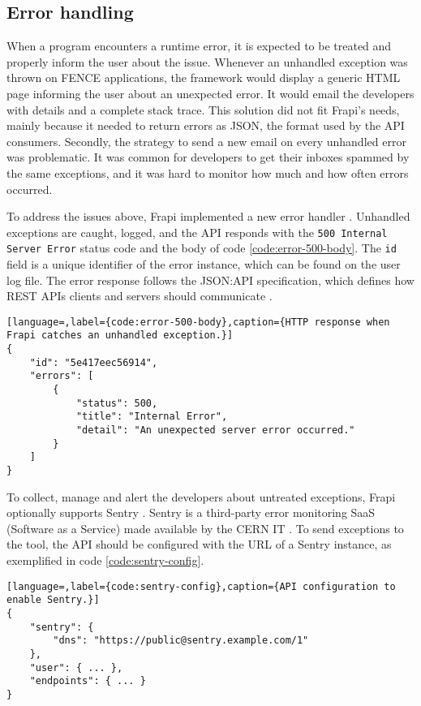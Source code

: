 \subsection{Error handling}

When a program encounters a runtime error, it is expected to be treated and properly inform the user about the issue. Whenever an unhandled exception was thrown on FENCE applications, the framework would display a generic HTML page informing the user about an unexpected error. It would email the developers with details and a complete stack trace. This solution did not fit Frapi's needs, mainly because it needed to return errors as JSON, the format used by the API consumers. Secondly, the strategy to send a new email on every unhandled error was problematic. It was common for developers to get their inboxes spammed by the same exceptions, and it was hard to monitor how much and how often errors occurred.

To address the issues above, Frapi implemented a new error handler \cite{frapi-error-handler-doc}. Unhandled exceptions are caught, logged, and the API responds with the \texttt{500 Internal Server Error} status code and the body of code \autoref{code:error-500-body}. The \texttt{id} field is a unique identifier of the error instance, which can be found on the user log file. The error response follows the JSON:API specification, which defines how REST APIs clients and servers should communicate \cite{json-api-intro} \cite{json-api-error} \cite{json-api-error-example}.

\begin{lstlisting}[language=,label={code:error-500-body},caption={HTTP response when Frapi catches an unhandled exception.}]
{
    "id": "5e417eec56914",
    "errors": [
        {
            "status": 500,
            "title": "Internal Error",
            "detail": "An unexpected server error occurred."
        }
    ]
}
\end{lstlisting}


To collect, manage and alert the developers about untreated exceptions, Frapi optionally supports Sentry \cite{sentry-about}. Sentry is a third-party error monitoring SaaS (Software as a Service) made available by the CERN IT \cite{sentry-cern}. To send exceptions to the tool, the API should be configured with the URL of a Sentry instance, as exemplified in code \autoref{code:sentry-config}.

\begin{lstlisting}[language=,label={code:sentry-config},caption={API configuration to enable Sentry.}]
{
    "sentry": {
        "dns": "https://public@sentry.example.com/1"
    },
    "user": { ... },
    "endpoints": { ... }
}
\end{lstlisting}


